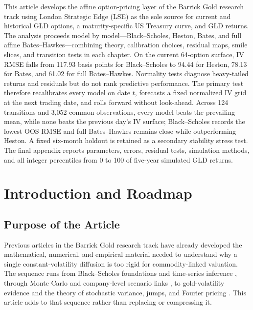 \documentclass[a4paper,10pt,titlepage,oneside,openany]{book}
\theoremstyle{plain}
\theoremstyle{definition}
\theoremstyle{remark}
\newenvironment{tightabstract}[1][0.88]{%
  \begin{center}
  \begin{tcolorbox}[title={Abstract}, width=#1\textwidth, left=5mm, right=5mm,
    colback=white, boxrule=0.4pt]
  \small\justifying
}{%
  \end{tcolorbox}
  \end{center}
}
\begin{document}
\begin{titlepage}
\begin{center}
\vspace{1cm}
\begin{tightabstract}
This article develops the affine option-pricing layer of the Barrick Gold research track using London Strategic Edge (LSE) as the sole source for current and historical GLD options, a maturity-specific US Treasury curve, and GLD returns. The analysis proceeds model by model---Black--Scholes, Heston, Bates, and full affine Bates--Hawkes---combining theory, calibration choices, residual maps, smile slices, and transition tests in each chapter. On the current 64-option surface, IV RMSE falls from 117.93 basis points for Black--Scholes to 94.44 for Heston, 78.13 for Bates, and 61.02 for full Bates--Hawkes. Normality tests diagnose heavy-tailed returns and residuals but do not rank predictive performance. The primary test therefore recalibrates every model on date $t$, forecasts a fixed normalized IV grid at the next trading date, and rolls forward without look-ahead. Across 124 transitions and 3,052 common observations, every model beats the prevailing mean, while none beats the previous day's IV surface; Black--Scholes records the lowest OOS RMSE and full Bates--Hawkes remains close while outperforming Heston. A fixed six-month holdout is retained as a secondary stability stress test. The final appendix reports parameters, errors, residual tests, simulation methods, and all integer percentiles from 0 to 100 of five-year simulated GLD returns.
\end{tightabstract}
\end{center}
\end{titlepage}

\frontmatter
\clearpage
{}
\setcounter{page}{1}
\tableofcontents
\thispagestyle{plain}

\mainmatter
\clearpage
\setcounter{page}{1}


\chapter{Introduction and Roadmap}

\section{Purpose of the Article}

Previous articles in the Barrick Gold research track have already developed the mathematical, numerical, and empirical material needed to understand why a single constant-volatility diffusion is too rigid for commodity-linked valuation. The sequence runs from Black--Scholes foundations and time-series inference \cite{BarrickArticle1,BarrickArticle2}, through Monte Carlo and company-level scenario links \cite{BarrickArticle3,BarrickArticle4,BarrickArticle5}, to gold-volatility evidence and the theory of stochastic variance, jumps, and Fourier pricing \cite{BarrickArticle6,BarrickArticle7}. This article adds to that sequence rather than replacing or compressing it.
\end{document}
